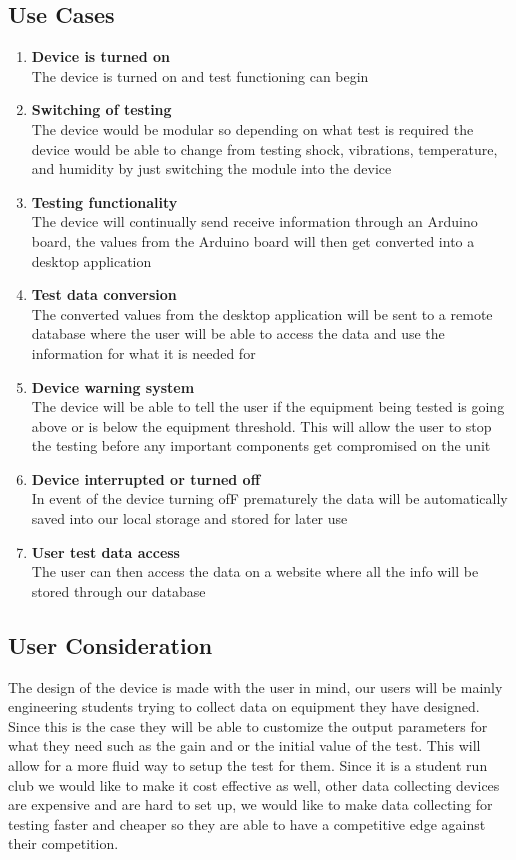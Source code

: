 \documentclass[12pt]{article}
\begin{document}
\subsection{Use Cases} 
\begin{enumerate}
  
  \item \textbf{Device is turned on}\\ The device is turned on and test functioning can begin \item \textbf{Switching of testing}\\ The device would be modular so depending on what test is required the device would be able to change from testing shock, vibrations, temperature, and humidity by just switching the module into the device \item \textbf{Testing functionality}\\ The device will continually send receive information through an Arduino board, the values from the Arduino board will then get converted into a desktop application \item \textbf{Test data conversion}\\ The converted values from the desktop application will be sent to a remote database where the user will be able to access the data and use the information for what it is needed for \item \textbf{Device warning system}\\ The device will be able to tell the user if the equipment being tested is going above or is below the equipment threshold. This will allow the user to stop the testing before any important components get compromised on the unit \item \textbf{Device interrupted or turned off}\\ In event of the device turning ofF prematurely the data will be automatically saved into our local storage and stored for later use \item \textbf{User test data access}\\ The user can then access the data on a website where all the info will be stored through our database


  
\end{enumerate}

\subsection{User Consideration}
The design of the device is made with the user in mind, our users will be mainly engineering students trying to collect data on equipment they have designed. Since this is the case they will be able to customize the output parameters for what they need such as the gain and or the initial value of the test. This will allow for a more fluid way to setup the test for them. Since it is a student run club we would like to make it cost effective as well, other data collecting devices are expensive and are hard to set up, we would like to make data collecting for testing faster and cheaper so they are able to have a competitive edge against their competition.
\end{document}
